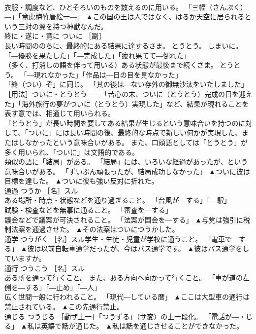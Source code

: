 \documentclass[8pt]{extreport}
\begin{document}
\begin{CJK}{UTF8}{min}
\\	衣服・調度など、ひとそろいのものを数えるのに用いる。 「三幅（さんぷく）―」「竜虎梅竹唐絵一―」	▲この国の王は人ではなく、はるか天空に居られるという三対の翼を持つ神獣なんだ。
\\	終に・遂に・竟に	ついに	［副］ 
\\	長い時間ののちに、最終的にある結果に達するさま。 とうとう。 しまいに。 「―優勝を果たした」「―完成した」「疲れ果てて―倒れた」 
\\	（多く、打消しの語を伴って用いる）ある状態が最後まで続くさま。 とうとう。 「―現れなかった」「作品は―日の目を見なかった」 
\\	「終（つい）ぞ」に同じ。 「其の後は―ない存外の御無沙汰をいたしました」 ［用法］ついに・とうとう――「苦心の末、ついに（とうとう）完成の日を迎えた」「海外旅行の夢がついに（とうとう）実現した」など、結果が現れることを表す意では、相通じて用いられる。 
\\	「とうとう」が長い時間を要してある結果が生じるという意味合いを持つのに対して、「ついに」には長い時間の後、最終的な時点で新しい何かが実現した、またはしなかったという意味合いがある。 また、口頭語としては「とうとう」が多く用いられ、「ついに」は文語的である。 
\\	類似の語に「結局」がある。 「結局」には、いろいな経過があったが、という意味合いがある。 「ずいぶん頑張ったが、結局成功しなかった」	▲ついに彼は目標を達した。 ▲ついに彼も強い反対に折れた。
\\	通過	つうか	［名］スル 
\\	ある場所・時点・状態などを通り過ぎること。 「台風が―する」「―駅」 
\\	試験・検査などを無事に通ること。 「審査を―する」 
\\	議会などで議案が可決されること。 「法案が国会を―する」	▲与党は強引に税制法案を通過させた。 ▲その法案はついにつうかした。
\\	通学	つうがく	［名］スル学生・生徒・児童が学校に通うこと。 「電車で―する」	▲彼は以前自転車通学だったが、今はバス通学です。 ▲彼はバス通学をしていますか。
\\	通行	つうこう	［名］スル 
\\	ある所を通って行くこと。 また、ある方向へ向かって行くこと。 「車が道の左側を―する」「―止め」「―人」 
\\	広く世間一般に行われること。 「現代―している暦」	▲ここは大型車の通行は禁止されている。 ▲この先通行禁止。
\\	通じる	つうじる	［動ザ上一］「つうずる」（サ変）の上一段化。 「電話が―・じる」	▲私は英語で話が通じた。 ▲私は話を通じさせることができなかった。

\end{CJK}
\end{document}
